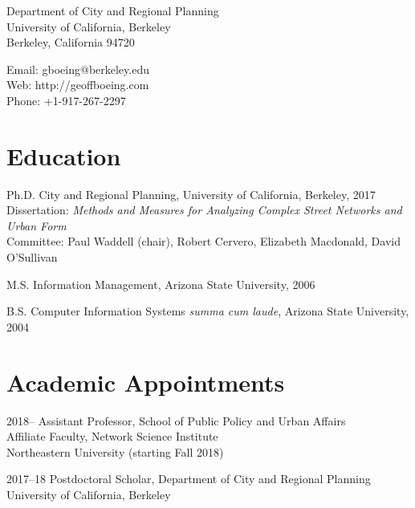 \documentclass{academiccv}
\begin{document}
\raggedright

\namefont{\myname}

\vspace{1em}
\begin{minipage}[t]{0.495\textwidth}
  Department of City and Regional Planning \\
  University of California, Berkeley \\
  Berkeley, California 94720
\end{minipage}
\begin{minipage}[t]{0.495\textwidth}
  Email: gboeing@berkeley.edu \\
  Web: http://geoffboeing.com \\
  Phone: +1-917-267-2297
\end{minipage}
\vspace{0.5em}



\section*{Education}

\begin{tablist}
	
\item[Ph.D.] \tab City and Regional Planning, University of California, Berkeley, 2017 \\
                  Dissertation: \textit{Methods and Measures for Analyzing Complex Street Networks and Urban Form} \\
                  Committee: Paul Waddell (chair), Robert Cervero, Elizabeth Macdonald, David O'Sullivan
                  
\item[M.S.]  \tab Information Management, Arizona State University, 2006

\item[B.S.]  \tab Computer Information Systems \textit{summa cum laude}, Arizona State University, 2004

\end{tablist}



\section*{Academic Appointments}

\begin{tablist}                     

\item[2018--]   \tab Assistant Professor, School of Public Policy and Urban Affairs \\
		        Affiliate Faculty, Network Science Institute \\
			    Northeastern University (starting Fall 2018)

\item[2017--18] \tab Postdoctoral Scholar, Department of City and Regional Planning \\
                University of California, Berkeley

\end{tablist}
\end{document}
